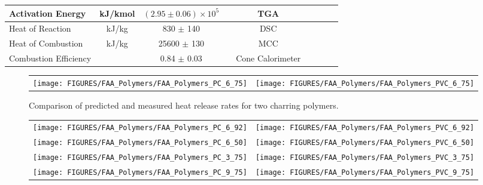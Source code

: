 \begin{table}[h!]
\begin{tabular}{|l|c|c|c|c|c|c|l|l|}
Activation Energy           & kJ/kmol       & $(2.95 \pm 0.06) \times 10^{5}$   &                   & TGA                   &  \cite{Stoliarov:CF2010}  \\ \hline
Heat of Reaction            & kJ/kg         & 830 $\pm$ 140                     &                      & DSC                   &  \cite{Stoliarov:PDS2008}  \\ \hline
Heat of Combustion          & kJ/kg         & 25600 $\pm$ 130                   &                      & MCC                   &  \cite{Stoliarov:CF2010}  \\ \hline
Combustion Efficiency       &               & 0.84 $\pm$ 0.03                   &                       & Cone Calorimeter      &  \cite{Stoliarov:CF2010}  \\ \hline
\end{tabular}
\label{FAA_Properties_Charring}
\end{table}

\begin{figure}[h!]
\begin{tabular*}{\textwidth}{l@{\extracolsep{\fill}}r}
\texttt{[image: FIGURES/FAA\_Polymers/FAA\_Polymers\_PC\_6\_75]} &
\texttt{[image: FIGURES/FAA\_Polymers/FAA\_Polymers\_PVC\_6\_75]}
\end{tabular*}
\caption[Results of FAA Polymers, charring, comparison]{Comparison of predicted and measured heat release rates for two charring polymers.}
\label{FAA_Polymers_Charring}
\end{figure}

\begin{figure}[p]
\begin{tabular*}{\textwidth}{l@{\extracolsep{\fill}}r}
\texttt{[image: FIGURES/FAA\_Polymers/FAA\_Polymers\_PC\_6\_92]} &
\texttt{[image: FIGURES/FAA\_Polymers/FAA\_Polymers\_PVC\_6\_92]}  \\
\texttt{[image: FIGURES/FAA\_Polymers/FAA\_Polymers\_PC\_6\_50]} &
\texttt{[image: FIGURES/FAA\_Polymers/FAA\_Polymers\_PVC\_6\_50]} \\
\texttt{[image: FIGURES/FAA\_Polymers/FAA\_Polymers\_PC\_3\_75]} &
\texttt{[image: FIGURES/FAA\_Polymers/FAA\_Polymers\_PVC\_3\_75]} \\
\texttt{[image: FIGURES/FAA\_Polymers/FAA\_Polymers\_PC\_9\_75]} &
\texttt{[image: FIGURES/FAA\_Polymers/FAA\_Polymers\_PVC\_9\_75]} \\
\end{tabular*}
\end{figure}


